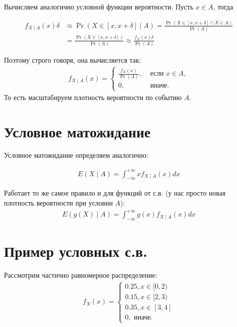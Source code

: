 \documentclass[12pt]{article}
\begin{document}
 Вычисляем аналогично условной функции вероятности. Пусть $x \in A$, тогда

 \begin{align*}
  f_{X\mid A} (x) \delta &\approx \Pr(X \in [x, x + \delta] \mid A) = \frac{\Pr(X \in [x, x + \delta] \cap X \in A)}{\Pr(A)} \\
  &= \frac{\Pr(X \in [x, x + \delta])}{\Pr(A)} \approx \frac{f_X(x) \delta}{\Pr(A)}
 \end{align*}

 Поэтому строго говоря, она вычисляется так:
 \begin{align*}
   f_{X\mid A}(x) = \begin{cases}
     \frac{f_X(x)}{\Pr(A)}, &\text{ если } x \in A, \\
     0, &\text{ иначе.}
   \end{cases}
 \end{align*}
 То есть масштабируем плотность вероятности по событию $A$.

 \section{Условное матожидание}

 Условное матожидание определяем аналогично:

 \begin{align*}
   E(X \mid A) = \int_{-\infty}^{+\infty} x f_{X \mid A}(x) dx
 \end{align*}

 Работает то же самое правило и для функций от с.в. (у нас просто новая плотность вероятности при условии $A$):
 \begin{align*}
   E(g(X) \mid A) = \int_{-\infty}^{+\infty} g(x) f_{X \mid A}(x) dx
 \end{align*}

 \section{Пример условных с.в.}

 Рассмотрим частично равномерное распределение:
 \begin{align*}
   f_X(x)  =\begin{cases}
     0.25, x \in [0, 2) \\
     0.15, x \in [2, 3) \\
     0.35, x \in [3, 4] \\
     0, \text{ иначе.}
   \end{cases}
 \end{align*}
\end{document}

